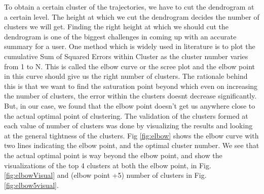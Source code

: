 To obtain a certain cluster of the trajectories, we have to cut the dendrogram at a certain level. The height at which we cut the dendrogram decides the number of clusters we will get. Finding the right height at which we should cut the dendrogram is one of the biggest challenges in coming up with an accurate summary for a user. One method which is widely used in literature is to plot the cumulative Sum of Squared Errors within Cluster as the cluster number varies from 1 to N. This is called the elbow curve or the scree plot and the elbow point in this curve should give us the right number of clusters. The rationale behind this is that we want to find the saturation point beyond which even on increasing the number of clusters, the error within the clusters doesnt decrease significantly. But, in our case, we found that the elbow point doesn't get us anywhere close to the actual optimal point of clustering. The validation of the clusters formed at each value of number of clusters was done by visualizing the results and looking at the general tightness of the clusters. Fig \ref{fig:elbow} shows the elbow curve with two lines indicating the elbow point, and the optimal cluster number. We see that the actual optimal point is way beyond the elbow point, and show the visualizations of the top 4 clusters at both the elbow point, in Fig. \ref{fig:elbowVisual} and (elbow point +5) number of clusters in Fig. \ref{fig:elbow5visual}.  


